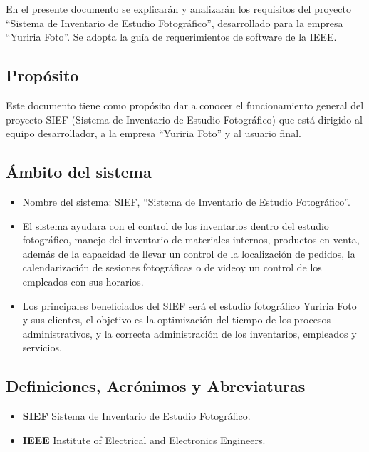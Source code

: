 En el presente documento se explicarán y analizarán los requisitos del proyecto “Sistema de Inventario de Estudio Fotográfico”, desarrollado para la empresa “Yuriria Foto”. Se adopta la guía de requerimientos de software de la IEEE.

\subsection{Propósito}

Este documento tiene como propósito dar a conocer el funcionamiento general del proyecto SIEF (Sistema de Inventario de Estudio Fotográfico) que está dirigido al equipo desarrollador, a la empresa “Yuriria Foto” y al usuario final.

\subsection{Ámbito del sistema}

\begin{itemize}
\item Nombre del sistema: SIEF, “Sistema de Inventario de Estudio Fotográfico”.
\item El sistema ayudara con el control de los inventarios dentro del estudio fotográfico, manejo del inventario de materiales internos, productos en venta, además de la capacidad de llevar un control de la localización de pedidos, la calendarización de sesiones fotográficas o de videoy un control de los empleados con sus horarios.
\item Los principales beneficiados del SIEF será el estudio fotográfico Yuriria Foto y sus clientes, el objetivo es la optimización del tiempo de los procesos administrativos, y la correcta administración de los inventarios, empleados y servicios.
\end{itemize}

\subsection{Definiciones, Acrónimos y Abreviaturas}

\begin{itemize}
\item \textbf{SIEF} Sistema de Inventario de Estudio Fotográfico.
\item \textbf{IEEE} Institute of Electrical and Electronics Engineers.
\end{itemize}


